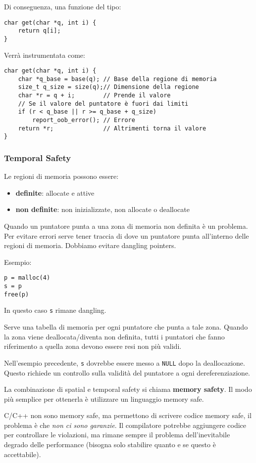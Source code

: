 Di conseguenza, una funzione del tipo: 
\begin{verbatim}
char get(char *q, int i) {
    return q[i];
}
\end{verbatim}
Verrà instrumentata come: 
\begin{verbatim}
char get(char *q, int i) {
    char *q_base = base(q); // Base della regione di memoria
    size_t q_size = size(q);// Dimensione della regione
    char *r = q + i;        // Prende il valore
    // Se il valore del puntatore è fuori dai limiti
    if (r < q_base || r >= q_base + q_size)
        report_oob_error(); // Errore
    return *r;              // Altrimenti torna il valore
}
\end{verbatim}

\subsubsection{Temporal Safety}

Le regioni di memoria possono essere: 
\begin{itemize}
	\item \textbf{definite}: allocate e attive
    
	\item \textbf{non definite}: non inizializzate, non allocate o deallocate
\end{itemize}

Quando un puntatore punta a una zona di memoria non definita è un problema. Per evitare errori serve tener traccia di dove un puntatore punta all'interno delle regioni di memoria. Dobbiamo evitare dangling pointers.

Esempio: 
\begin{verbatim}
p = malloc(4)
s = p
free(p)
\end{verbatim}
In questo caso \texttt{s} rimane dangling.

Serve una tabella di memoria per ogni puntatore che punta a tale zona. Quando la zona viene deallocata/diventa non definita, tutti i puntatori che fanno riferimento a quella zona devono essere resi non più validi. 

Nell'esempio precedente, \texttt{s} dovrebbe essere messo a \texttt{NULL} dopo la deallocazione. Questo richiede un controllo sulla validità del puntatore a ogni dereferenziazione.

La combinazione di spatial e temporal safety si chiama \textbf{memory safety}. Il modo più semplice per ottenerla è utilizzare un linguaggio memory safe. 

C/C++ non sono memory safe, ma permettono di scrivere codice memory safe, il problema è che \textit{non ci sono garanzie}. Il compilatore potrebbe aggiungere codice per controllare le violazioni, ma rimane sempre il problema dell'inevitabile degrado delle performance (bisogna solo stabilire quanto e se questo è accettabile).

